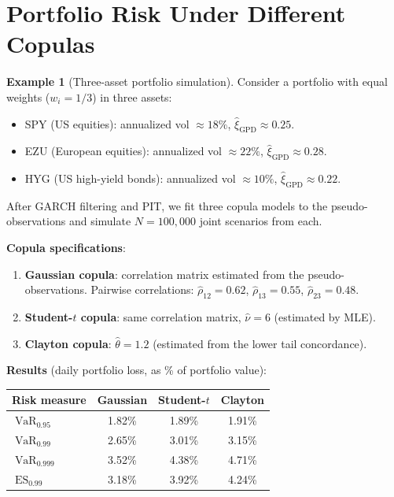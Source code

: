 \documentclass[11pt, a4paper]{article}
\theoremstyle{definition}
\newtheorem{example}{Example}[section]
\theoremstyle{plain}
\theoremstyle{remark}
\newcommand{\VaR}{\operatorname{VaR}}
\newcommand{\ES}{\operatorname{ES}}
\begin{document}
\section{Portfolio Risk Under Different Copulas}
\label{sec:portfolio}

\begin{example}[Three-asset portfolio simulation]\label{ex:portfolio}
Consider a portfolio with equal weights ($w_i = 1/3$) in three assets:
\begin{itemize}
    \item SPY (US equities): annualized vol $\approx 18\%$, $\hat\xi_{\text{GPD}} \approx 0.25$.
    \item EZU (European equities): annualized vol $\approx 22\%$, $\hat\xi_{\text{GPD}} \approx 0.28$.
    \item HYG (US high-yield bonds): annualized vol $\approx 10\%$, $\hat\xi_{\text{GPD}} \approx 0.22$.
\end{itemize}

After GARCH filtering and PIT, we fit three copula models to the pseudo-observations
and simulate $N = 100{,}000$ joint scenarios from each.

\medskip
\textbf{Copula specifications}:
\begin{enumerate}
    \item \textbf{Gaussian copula}: correlation matrix estimated from the pseudo-observations.
    Pairwise correlations: $\hat\rho_{12} = 0.62$, $\hat\rho_{13} = 0.55$, $\hat\rho_{23} = 0.48$.

    \item \textbf{Student-$t$ copula}: same correlation matrix, $\hat\nu = 6$ (estimated by MLE).

    \item \textbf{Clayton copula}: $\hat\theta = 1.2$ (estimated from the lower tail concordance).
\end{enumerate}

\medskip
\textbf{Results} (daily portfolio loss, as \% of portfolio value):

\begin{center}
\begin{tabular}{@{}lccc@{}}
\toprule
\textbf{Risk measure} & \textbf{Gaussian} & \textbf{Student-$t$} & \textbf{Clayton} \\
\midrule
$\VaR_{0.95}$ & 1.82\% & 1.89\% & 1.91\% \\
$\VaR_{0.99}$ & 2.65\% & 3.01\% & 3.15\% \\
$\VaR_{0.999}$ & 3.52\% & 4.38\% & 4.71\% \\
$\ES_{0.99}$ & 3.18\% & 3.92\% & 4.24\% \\
\bottomrule
\end{tabular}
\end{center}


\end{example}
\end{document}
